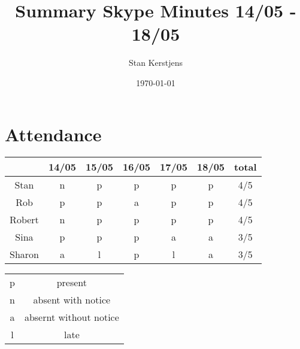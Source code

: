 \documentclass{article}
\title{Summary Skype Minutes 14/05 - 18/05}
\author{Stan Kerstjens}
\date{\today}
\begin{document}
	\maketitle

	\section{Attendance}
		\begin{table}[h!]
		\centering
			\begin{tabular}{c|cccccc}
					& 14/05	& 15/05 & 16/05 & 17/05 & 18/05 & total\\\hline\hline
			Stan 	&	n	&	p	&	p	&	p	&	p	& 4/5\\
			Rob 	&	p	&	p	&	a	&	p	&	p	& 4/5\\
			Robert 	&	n	&	p	&	p	&	p	&	p	& 4/5\\
			Sina 	&	p	&	p	&	p	&	a	&	a	& 3/5\\
			Sharon 	&	a	&	l	&	p	&	l	&	a	& 3/5\\\hline
			\end{tabular}
			\begin{tabular}{cc}\hline
			p & present\\
			n & absent with notice\\
			a & absernt without notice\\
			l & late\\\hline
			\end{tabular}
		\end{table}
	
\end{document}
